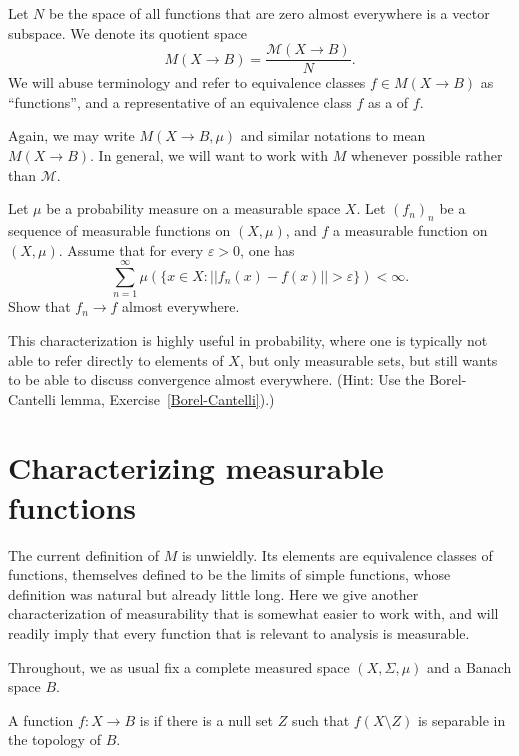 \begin{definition}
Let $N$ be the space of all functions that are zero almost everywhere is a vector subspace. We denote its quotient space
\[M(X \to B) = \frac{\mathcal M(X \to B)}{N}.\]
We will abuse terminology and refer to equivalence classes $f \in M(X \to B)$ as ``functions'', and a representative of an equivalence class $f$ as a  of $f$.
\end{definition}

\begin{subsec}
Again, we may write $M(X \to B, \mu)$ and similar notations to mean $M(X \to B)$.
In general, we will want to work with $M$ whenever possible rather than $\mathcal M$.
\end{subsec}

\begin{exercise}
Let $\mu$ be a probability measure on a measurable space $X$.
Let $(f_{n})_{n}$ be a sequence of measurable functions on $(X, \mu)$, and $f$ a measurable function on $(X, \mu)$.
Assume that for every $\varepsilon > 0$, one has
\[\sum_{n=1}^{\infty} \mu(\{x \in X: ||f_{n}(x) - f(x)|| > \varepsilon\}) < \infty.\]
Show that $f_{n} \to f$ almost everywhere.

This characterization is highly useful in probability, where one is typically not able to refer directly to elements of $X$, but only measurable sets, but still wants to be able to discuss convergence almost everywhere.
(Hint: Use the Borel-Cantelli lemma, Exercise~\ref{Borel-Cantelli}).)
\end{exercise}



\section{Characterizing measurable functions}
The current definition of $M$ is unwieldly. Its elements are equivalence classes of functions, themselves defined to be the limits of simple functions, whose definition was natural but already little long.
Here we give another characterization of measurability that is somewhat easier to work with, and will readily imply that every function that is relevant to analysis is measurable.

\begin{subsec}
Throughout, we as usual fix a complete measured space $(X, \Sigma, \mu)$ and a Banach space $B$.
\end{subsec}

\begin{definition}
\label{almost separably valued dfn}
A function $f: X \to B$ is  if there is a null set $Z$ such that $f(X \setminus Z)$ is separable in the topology of $B$.
\end{definition}

